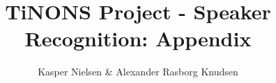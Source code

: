 \documentclass[]{report}
\title{TiNONS Project - Speaker Recognition: Appendix}
\author{Kasper Nielsen \& Alexander Rasborg Knudsen}
\begin{document}
\maketitle

\listoffixmes













\end{document}

